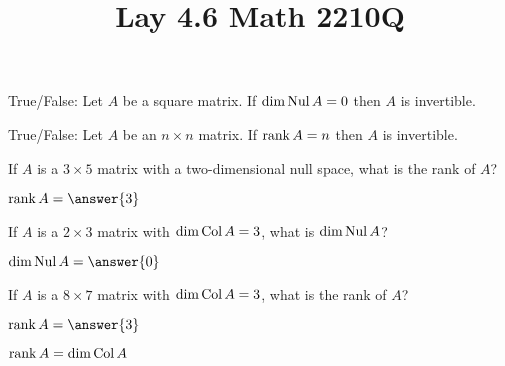 \documentclass{ximera}
\def\Nul{\mathop{\rm Nul}}
\def\Col{\mathop{\rm Col}}
\def\dim{\mathop{\rm dim}}
\def\rank{\mathop{\rm rank}}
\begin{document}
  	\title{Lay 4.6  \hfill Math 2210Q} 
  	  		    \begin{question} True/False: Let $A$ be a square matrix. If $\dim \Nul A = 0$ then $A$ is invertible.
  	  		    	
  	  		    	\begin{multipleChoice}
  	  		    	\end{multipleChoice}
  	  		    	
  	  		    \end{question}	
  	  		    \begin{question} True/False: Let $A$ be an $n\times n$ matrix. If $\rank A = n$ then $A$ is invertible.
  	  		    	
  	  		    	\begin{multipleChoice}
  	  		    		\choice[correct]{True}
  	  		    		\choice{False}
  	  		    	\end{multipleChoice}
  	  		    	
  	  		    \end{question}	
  	  		      \begin{question} If $A$ is  a $3\times 5$ matrix with a two-dimensional null space, what is the rank of $A$?
  	  		      	
  	  		     $\rank A = \answer{3}$
  	  		      	
  	  		      \end{question}	
  	  		       \begin{question} If $A$ is  a $2\times 3$ matrix with $\dim \Col A = 3$, what is $\dim \Nul A$?
  	  		       	
  	  		       	$\dim\Nul A = \answer{0}$
  	  		       	
  	  		       \end{question}	
  	  		        \begin{question} If $A$ is  a $8\times 7$ matrix with $\dim \Col A = 3$, what is the rank of $A$?
  	  		        	
  	  		        	$\rank A = \answer{3}$
  	  		        	
  	  		        	\vspace{10pt}
  	  		        	\begin{hint}
  	  		        		$\rank A = \dim \Col A$
  	  		        		\end{hint}
  	  		        \end{question}	
\end{document}
